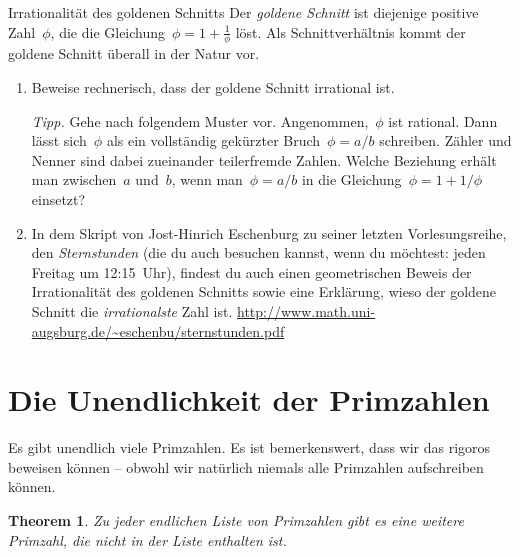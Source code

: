 \documentclass[twoside]{../zirkelblatt1415}
\theoremstyle{definition}
\theoremstyle{plain}
\newtheorem{thm}[defn]{Theorem}
\theoremstyle{remark}
\begin{document}
\begin{aufgabe}{Irrationalität des goldenen Schnitts}
Der \emph{goldene Schnitt} ist diejenige positive Zahl~$\phi$, die die
Gleichung~$\phi = 1 + \frac{1}{\phi}$ löst. Als Schnittverhältnis kommt der goldene
Schnitt überall in der Natur vor.

\begin{enumerate}
\item Beweise rechnerisch, dass der goldene Schnitt irrational ist.

\emph{Tipp.} Gehe nach folgendem Muster vor. Angenommen,~$\phi$ ist rational.
Dann lässt sich~$\phi$ als ein vollständig gekürzter Bruch~$\phi = a/b$
schreiben. Zähler und Nenner sind dabei zueinander teilerfremde Zahlen. Welche
Beziehung erhält man zwischen~$a$ und~$b$, wenn man~$\phi = a/b$ in die
Gleichung~$\phi = 1 + 1/\phi$ einsetzt?

\item In dem Skript von Jost-Hinrich Eschenburg zu seiner letzten
Vorlesungsreihe, den \emph{Sternstunden} (die du auch besuchen kannst, wenn du
möchtest: jeden Freitag um 12:15~Uhr), findest du auch einen geometrischen
Beweis der Irrationalität des goldenen Schnitts sowie eine Erklärung, wieso der
goldene Schnitt die \emph{irrationalste} Zahl ist.
\url{http://www.math.uni-augsburg.de/~eschenbu/sternstunden.pdf}
\end{enumerate}\fixlistspacing
\end{aufgabe}


\section{Die Unendlichkeit der Primzahlen}

Es gibt unendlich viele Primzahlen. Es ist bemerkenswert, dass wir das rigoros
beweisen können -- obwohl wir natürlich niemals alle Primzahlen aufschreiben
können.

\begin{thm}Zu jeder endlichen Liste von Primzahlen gibt es eine weitere
Primzahl, die nicht in der Liste enthalten ist.\end{thm}
\end{document}
